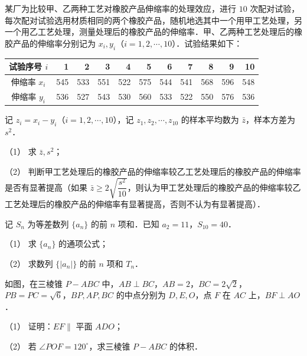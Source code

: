 \begin{question}
某厂为比较甲、乙两种工艺对橡胶产品伸缩率的处理效应，进行 $10$ 次配对试验，每次配对试验选用材质相同的两个橡胶产品，随机地选其中一个用甲工艺处理，另一个用乙工艺处理，测量处理后的橡胶产品的伸缩率．甲、乙两种工艺处理后的橡胶产品的伸缩率分别记为 $x_i,y_i$（$i=1,2,\cdots,10$）．试验结果如下：

\begin{center}
\begingroup\setlength{\tabcolsep}{4pt}
\begin{tabular}{crrrrrrrrrr}
\toprule
试验序号 $i$ & 1 & 2 & 3 & 4 & 5 & 6 & 7 & 8 & 9 & 10 \\
\midrule
伸缩率 $x_i$ & 545 & 533 & 551 & 522 & 575 & 544 & 541 & 568 & 596 & 548 \\
伸缩率 $y_i$ & 536 & 527 & 543 & 530 & 560 & 533 & 522 & 550 & 576 & 536 \\
\bottomrule
\end{tabular}
\endgroup
\end{center}

记 $z_i=x_i-y_i$（$i=1,2,\cdots,10$），记 $z_1,z_2,\cdots,z_{10}$ 的样本平均数为 $\bar z$，样本方差为 $s^2$．

（1） 求 $\bar z,s^2$；

（2） 判断甲工艺处理后的橡胶产品的伸缩率较乙工艺处理后的橡胶产品的伸缩率是否有显著提高（如果 $\bar z\geqslant2\sqrt{\dfrac{s^2}{10}}$，则认为甲工艺处理后的橡胶产品的伸缩率较乙工艺处理后的橡胶产品的伸缩率有显著提高，否则不认为有显著提高）．

\end{question}
\begin{question}
记 $S_n$ 为等差数列 $\{a_n\}$ 的前 $n$ 项和．已知 $a_2=11$，$S_{10}=40$．

（1） 求 $\{a_n\}$ 的通项公式；

（2） 求数列 $\{|a_n|\}$ 的前 $n$ 项和 $T_n$．

\Needspace{0.4\textheight}
\end{question}
\begin{question}
如图，在三棱锥 $P-ABC$ 中，$AB\perp BC$，$AB=2$，$BC=2\sqrt2$，$PB=PC=\sqrt6$，$BP,AP,BC$ 的中点分别为 $D,E,O$，点 $F$ 在 $AC$ 上，$BF\perp AO$．
\nopagebreak[4]
\begin{center}\end{center}
\nopagebreak[4]
（1） 证明：$EF\parallel$ 平面 $ADO$；

（2） 若 $\angle POF=120^\circ$，求三棱锥 $P-ABC$ 的体积．

\end{question}
